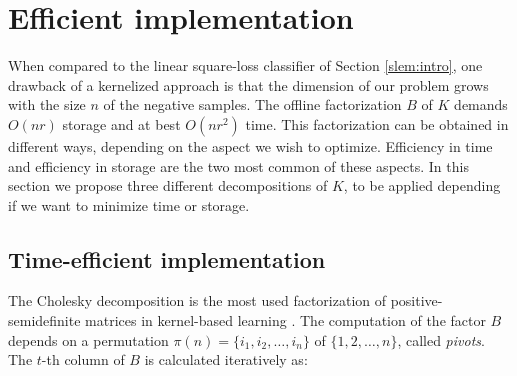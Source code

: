 
\section{Efficient implementation}\label{eff_imp}


When compared to the linear square-loss classifier of Section \ref{slem:intro}, one drawback of a kernelized approach is that the dimension of our problem grows with the size $n$ of the negative samples.
The offline factorization $B$ of $K$ demands $O(nr)$ storage and at best $O(nr^2)$ time. This factorization can be obtained in different ways, depending on the aspect we wish to optimize. Efficiency in time and efficiency in storage are the two most common of these aspects. In this section we propose three different decompositions of $K$, to be applied depending if we want to minimize time or storage.



\subsection{Time-efficient implementation}
The Cholesky decomposition is the most used factorization of positive-semidefinite matrices in kernel-based learning \cite{BaJo02,BaJo05,FiSc01}. 
The computation of the factor $B$ depends on a permutation $\pi(n) =\{i_1,i_2,\dots,i_n\}$ of $\{1,2,\dots, n\}$, called \textit{pivots}. The $t$-th column of $B$ is calculated iteratively as:

